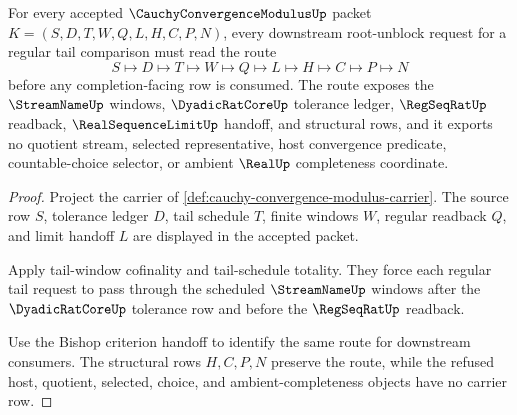 \begin{theorem}
\label{thm:cauchy-convergence-modulus-root-unblock-tail-route}
For every accepted $\CauchyConvergenceModulusUp$ packet $K=(S,D,T,W,Q,L,H,C,P,N)$, every downstream root-unblock request for a regular tail comparison must read the route
$$
S\longmapsto D\longmapsto T\longmapsto W\longmapsto Q\longmapsto L\longmapsto H\longmapsto C\longmapsto P\longmapsto N
$$
before any completion-facing row is consumed. The route exposes the $\StreamNameUp$ windows, $\DyadicRatCoreUp$ tolerance ledger, $\RegSeqRatUp$ readback, $\RealSequenceLimitUp$ handoff, and structural rows, and it exports no quotient stream, selected representative, host convergence predicate, countable-choice selector, or ambient $\RealUp$ completeness coordinate.
\end{theorem}
\begin{proof}
Project the carrier of \autoref{def:cauchy-convergence-modulus-carrier}. The source row $S$, tolerance ledger $D$, tail schedule $T$, finite windows $W$, regular readback $Q$, and limit handoff $L$ are displayed in the accepted packet.

Apply tail-window cofinality and tail-schedule totality. They force each regular tail request to pass through the scheduled $\StreamNameUp$ windows after the $\DyadicRatCoreUp$ tolerance row and before the $\RegSeqRatUp$ readback.

Use the Bishop criterion handoff to identify the same route for downstream consumers. The structural rows $H,C,P,N$ preserve the route, while the refused host, quotient, selected, choice, and ambient-completeness objects have no carrier row.
\end{proof}

